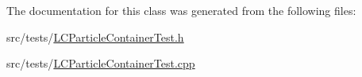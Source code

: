 The documentation for this class was generated from the following files\-:\begin{DoxyCompactItemize}
\item 
src/tests/\hyperlink{LCParticleContainerTest_8h}{L\-C\-Particle\-Container\-Test.\-h}\item 
src/tests/\hyperlink{LCParticleContainerTest_8cpp}{L\-C\-Particle\-Container\-Test.\-cpp}\end{DoxyCompactItemize}
